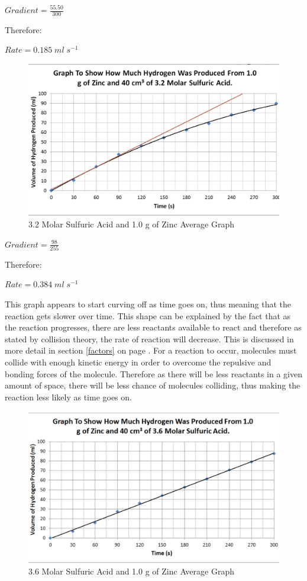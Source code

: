 $Gradient = \frac{55.50}{300}$

Therefore:

$Rate = 0.185 \; ml \; s^{-1}$

\begin{figure}[H]
    \includegraphics[width=\textwidth]{./Analysis/Images/1NonCatalyst/32Molar.pdf}
    \caption{3.2 Molar Sulfuric Acid and 1.0 g of Zinc Average Graph} \label{fig:32MolarSAGradient}
\end{figure}

$Gradient = \frac{98}{255}$

Therefore:

$Rate = 0.384 \; ml \; s^{-1}$

This graph appears to start curving off as time goes on, thus meaning that the reaction gets slower over time. This shape can be explained by the fact that as the reaction progresses, there are less reactants available to react and therefore as stated by collision theory, the rate of reaction will decrease. This is discussed in more detail in section \ref{factors} on page \pageref{factors}. For a reaction to occur, molecules must collide with enough kinetic energy in order to overcome the repulsive and bonding forces of the molecule. Therefore as there will be less reactants in a given amount of space, there will be less chance of molecules colliding, thus making the reaction less likely as time goes on. 

\begin{figure}[H]
    \includegraphics[width=\textwidth]{./Analysis/Images/1NonCatalyst/36Molar.pdf}
    \caption{3.6 Molar Sulfuric Acid and 1.0 g of Zinc Average Graph} \label{fig:36MolarSAGradient}
\end{figure}

